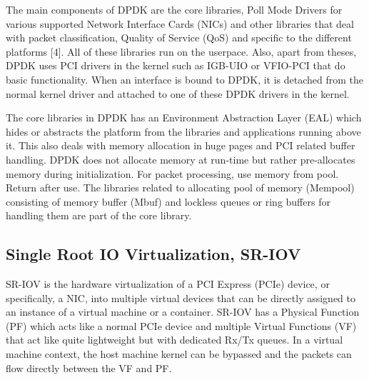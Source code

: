 \documentclass[english, 12pt, a4paper, elec, utf8, a-1b, online]{aaltothesis}
\begin{document}
The main components of DPDK are the core libraries, Poll Mode Drivers for various supported Network Interface Cards (NICs) and other libraries that deal with packet classification, Quality of Service (QoS) and specific to the different platforms [4]. All of these libraries run on the userpace. Also, apart from theses, DPDK uses PCI drivers in the kernel such as IGB-UIO or VFIO-PCI that do basic functionality. When an interface is bound to DPDK, it is detached from the normal kernel driver and attached to one of these DPDK drivers in the kernel.


The core libraries in DPDK has an Environment Abstraction Layer (EAL) which hides or abstracts the platform from the libraries and applications running above it. This also deals with memory allocation in huge pages and PCI related buffer handling. DPDK does not allocate memory at run-time but rather pre-allocates memory during initialization. For packet processing, use memory from pool. Return after use. The libraries related to allocating pool of memory (Mempool) consisting of memory buffer (Mbuf) and lockless queues or ring buffers for handling them are part of the core library.

\subsection{Single Root IO Virtualization, SR-IOV}
SR-IOV is the hardware virtualization of a PCI Express (PCIe) device, or specifically, a NIC, into multiple virtual devices that can be directly assigned to an instance of a virtual machine or a container. SR-IOV has a Physical Function (PF) which acts like a normal PCIe device and multiple Virtual Functions (VF) that act like quite lightweight but with dedicated Rx/Tx queues. In a virtual machine context, the host machine kernel can be bypassed and the packets can flow directly between the VF and PF.
\end{document}
